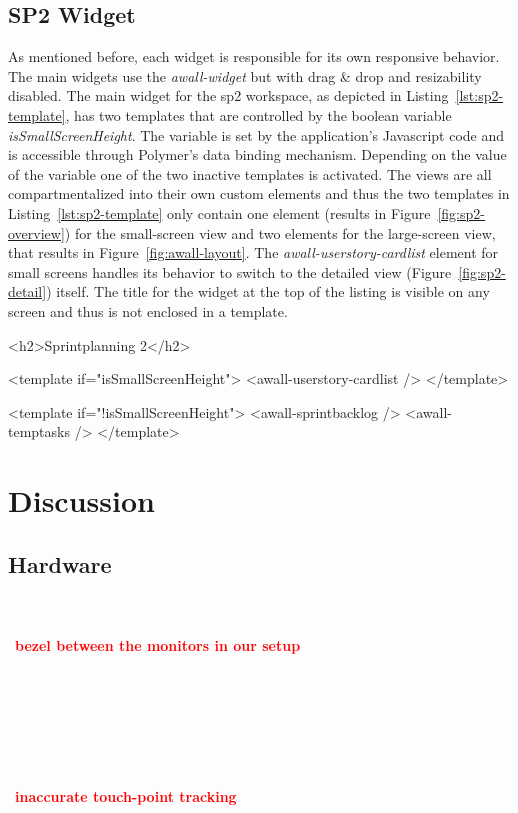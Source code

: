 \documentclass{sigchi}
\newcommand{\todo}[1]{~\\\\~\textbf{\large{\textcolor{red}{#1}}}\\~\\~\\~\\~}
\begin{document}
\subsection{SP2 Widget}
As mentioned before, each widget is responsible for its own responsive behavior.
The main widgets use the \textit{awall-widget} but with drag \& drop and resizability disabled.
The main widget for the \gls{sp2} workspace, as depicted in Listing~\ref{lst:sp2-template}, has two templates that are controlled by the boolean variable \textit{isSmallScreenHeight}.
The variable is set by the application's Javascript code and is accessible through Polymer's data binding mechanism.
Depending on the value of the variable one of the two inactive templates is activated.
The views are all compartmentalized into their own custom elements and thus the two templates in Listing~\ref{lst:sp2-template} only contain one element (results in Figure~\ref{fig:sp2-overview}) for the small-screen view and two elements for the large-screen view, that results in Figure~\ref{fig:awall-layout}.
The \textit{awall-userstory-cardlist} element for small screens handles its behavior to switch to the detailed view (Figure~\ref{fig:sp2-detail}) itself.
The title for the widget at the top of the listing is visible on any screen and thus is not enclosed in a template.

\begin{code}[caption={How the \gls{sp2} main widget decides which view to show.},label=lst:sp2-template]
<h2>Sprintplanning 2</h2>

<template if="{{isSmallScreenHeight}}">
  <awall-userstory-cardlist />
</template>

<template if="{{!isSmallScreenHeight}}">
  <awall-sprintbacklog />
  <awall-temptasks />
</template>
\end{code}


\section{Discussion}

\subsection{Hardware}
\todo{bezel between the monitors in our setup}

\todo{inaccurate touch-point tracking}
\end{document}
